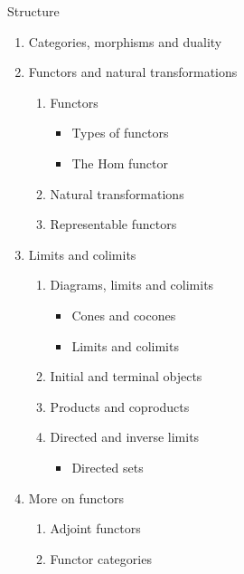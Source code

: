 \documentclass[../../main]{subfiles}
\begin{document}
Structure
\begin{enumerate}
  \item Categories, morphisms and duality
  \item Functors and natural transformations
  \begin{enumerate}
    \item Functors
    \begin{itemize}
      \item Types of functors
      \item The Hom functor
    \end{itemize}
    \item Natural transformations
    \item Representable functors
  \end{enumerate}
  \item Limits and colimits
  \begin{enumerate}
    \item Diagrams, limits and colimits
    \begin{itemize}
      \item Cones and cocones
      \item Limits and colimits
    \end{itemize}
    \item Initial and terminal objects
    \item Products and coproducts
    \item Directed and inverse limits
    \begin{itemize}
      \item Directed sets
    \end{itemize}
  \end{enumerate}
  \item More on functors
  \begin{enumerate}
    \item Adjoint functors
    \item Functor categories
  \end{enumerate}
\end{enumerate}
\end{document}
